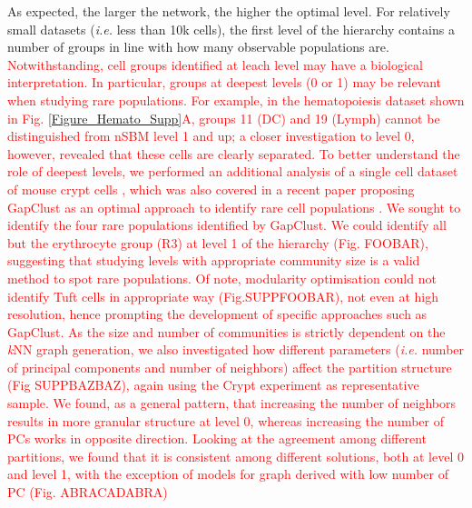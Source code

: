 \documentclass[10pt]{article}
\begin{document}
As expected, the larger the network, the higher the optimal level. For relatively small datasets (\emph{i.e.} less than 10k cells), the first level of the hierarchy contains a number of groups in line with how many observable populations are. 
\textcolor{red}{Notwithstanding, cell groups identified at leach level may have a biological interpretation. In particular, groups at deepest levels (0 or 1) may be relevant when studying rare populations. For example, in the hematopoiesis dataset shown in Fig. \ref{Figure_Hemato_Supp}A, groups 11 (DC) and 19 (Lymph) cannot be distinguished from nSBM level 1 and up; a closer investigation to level 0, however, revealed that these cells are clearly separated. To better understand the role of deepest levels, we performed an additional analysis of a single cell dataset of mouse crypt cells \cite{Ayyaz_Kumar_2019}, which was also covered in a recent paper proposing GapClust as an optimal approach to identify rare cell populations \cite{Fa_Wei_Zhou_Johnston_2021}. We sought to identify the four rare populations identified by GapClust. We could identify all but the erythrocyte group (R3) at level 1 of the hierarchy (Fig. FOOBAR), suggesting that studying levels with appropriate community size is a valid method to spot rare populations. Of note, modularity optimisation could not identify Tuft cells in appropriate way (Fig.SUPPFOOBAR), not even at high resolution, hence prompting the development of specific approaches such as GapClust. 
As the size and number of communities is strictly dependent on the \emph{k}NN graph generation, we also investigated how different parameters (\emph{i.e.} number of principal components and number of neighbors) affect the partition structure (Fig SUPPBAZBAZ), again using the Crypt experiment as representative sample. We found, as a general pattern, that increasing the number of neighbors results in more granular structure at level 0, whereas increasing the number of PCs works in opposite direction. Looking at the agreement among different partitions, we found that it is consistent among different solutions, both at level 0 and level 1, with the exception of models for graph derived with low number of PC (Fig. ABRACADABRA)}

\end{document}
